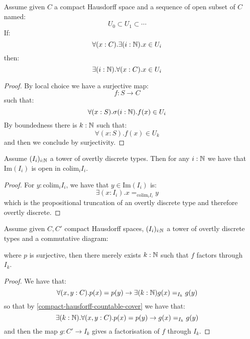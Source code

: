 \begin{lemma}\label{compact-hausforff-countable-cover}
Assume given $C$ a compact Hausdorff space and a sequence of open subset of $C$ named:
\[U_0\subset U_1 \subset \cdots\]
If:
\[\forall(x:C).\exists(i:\mathbb{N}). x\in U_i\]
then:
\[\exists(i:\mathbb{N}). \forall(x:C).x\in U_i\]
\end{lemma}

\begin{proof}
By local choice we have a surjective map:
\[ f: S \to C\]
such that:
\[\forall(x:S).\sigma (i:\mathbb{N}). f(x)\in U_i\]
By boundedness there is $k:\mathbb{N}$ such that:
\[\forall(x:S). f(x)\in U_k\]
and then we conclude by surjectivity.
\end{proof}

\begin{lemma}\label{overtly-discrete-union-open}
Assume $(I_i)_{i:\mathbb{N}}$ a tower of overtly discrete types. Then for any $i:\mathbb{N}$ we have that $\mathrm{Im}(I_i)$ is open in $\mathrm{colim}_i I_i$. 
\end{lemma}

\begin{proof}
For $y:\mathrm{colim}_iI_i$, we have that $y\in \mathrm{Im}(I_i)$ is:
\[\exists(x:I_i). x=_{\mathrm{colim}_iI_i}y\]
which is the propositional truncation of an overtly discrete type and therefore overtly discrete.
\end{proof}

\begin{lemma}\label{factorisation-compact-hausdorff-cover}
Assume given $C,C'$ compact Hausdorff spaces, $(I_i)_{i:\mathbb{N}}$ a tower of overtly discrete types and a commutative diagram:
\begin{center}
\end{center}
where $p$ is surjective, then there merely exists $k:\mathbb{N}$ such that $f$ factors through $I_k$.
\end{lemma}

\begin{proof}
We have that:
\[\forall(x,y:C). p(x)=p(y) \to \exists(k:\mathbb{N}) g(x)=_{I_k}g(y)\]
so that by \cref{compact-hausforff-countable-cover} we have that:
\[\exists(k:\mathbb{N}). \forall(x,y:C). p(x)=p(y) \to g(x)=_{I_k}g(y)\]
and then the map $g:C'\to I_k$ gives a factorisation of $f$ through $I_k$.
\end{proof}

